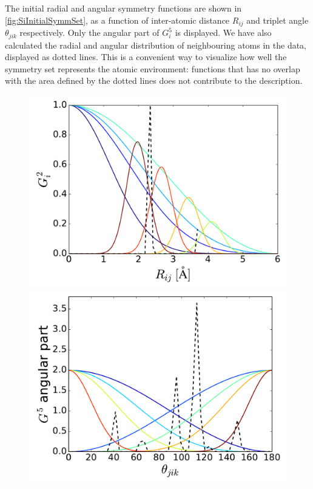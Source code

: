 \documentclass[twoside,english]{uiofysmaster}
\begin{document}
The initial radial and angular symmetry functions are shown in \autoref{fig:SiInitialSymmSet}, as a function 
of inter-atomic distance $R_{ij}$ and triplet angle $\theta_{jik}$ respectively. 
Only the angular part of $G_i^5$ is displayed. 
We have also calculated the radial and angular distribution of neighbouring atoms in the data, displayed as dotted lines.
This is a convenient way to visualize how well the symmetry set represents the atomic environment:
functions that has no overlap with the area defined by the dotted lines does not contribute to the description. 
\begin{figure}
 \begin{minipage}{0.48\linewidth}
  \includegraphics[width=\textwidth]{Figures/Results/SiInitialSymmG2.pdf}
 \end{minipage}
\quad
\begin{minipage}{0.48\linewidth}
 \includegraphics[width=\textwidth]{Figures/Results/SiInitialSymmG5.pdf}

\end{minipage}
\end{figure}
\end{document}

